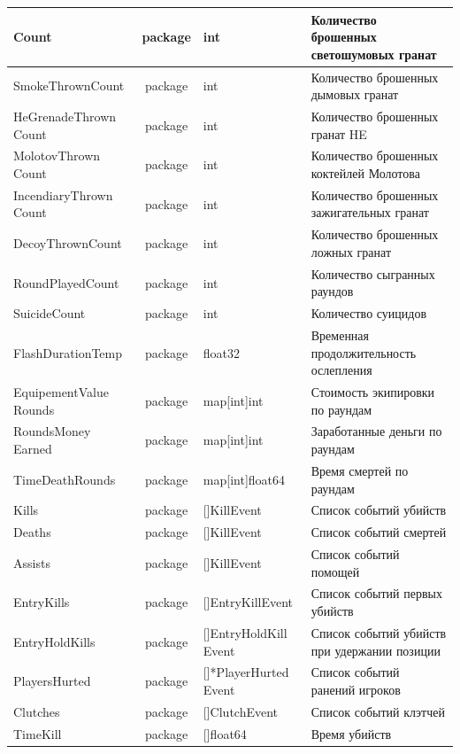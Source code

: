 \begin{xltabular}{\textwidth}{|X|c|X|X|}
	Count & package & int & Количество брошенных светошумовых гранат \\ \hline
	SmokeThrownCount & package & int & Количество брошенных дымовых гранат \\ \hline
	HeGrenadeThrown
	Count & package & int & Количество брошенных гранат HE \\ \hline
	MolotovThrown
	Count & package & int & Количество брошенных коктейлей Молотова \\ \hline
	IncendiaryThrown
	Count & package & int & Количество брошенных зажигательных гранат \\ \hline
	DecoyThrownCount & package & int & Количество брошенных ложных гранат \\ \hline
	RoundPlayedCount & package & int & Количество сыгранных раундов \\ \hline
	SuicideCount & package & int & Количество суицидов \\ \hline
	FlashDurationTemp & package & float32 & Временная продолжительность ослепления \\ \hline
	EquipementValue
	Rounds & package & map[int]int & Стоимость экипировки по раундам \\ \hline
	RoundsMoney
	Earned & package & map[int]int & Заработанные деньги по раундам \\ \hline
	TimeDeathRounds & package & map[int]float64 & Время смертей по раундам \\ \hline
	Kills & package & []KillEvent & Список событий убийств \\ \hline
	Deaths & package & []KillEvent & Список событий смертей \\ \hline
	Assists & package & []KillEvent & Список событий помощей \\ \hline
	EntryKills & package & []EntryKillEvent & Список событий первых убийств \\ \hline
	EntryHoldKills & package & []EntryHoldKill
	Event & Список событий убийств при удержании позиции \\ \hline
	PlayersHurted & package & []*PlayerHurted
	Event & Список событий ранений игроков \\ \hline
	Clutches & package & []ClutchEvent & Список событий клэтчей \\ \hline
	TimeKill & package & []float64 & Время убийств \\ \hline
\end{xltabular}

